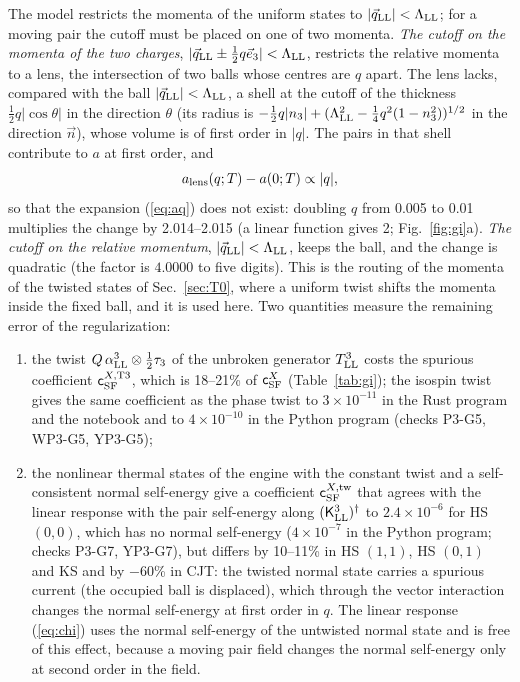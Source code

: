 \documentclass[aps,prd,onecolumn,superscriptaddress,nofootinbib,floatfix,longbibliography]{revtex4-2}
\newcommand{\LL}{{\rm LL}}
\newcommand{\SF}{{\rm SF}}
\begin{document}
The model restricts the momenta of the uniform states to $|\vec q_\LL|<\Lambda_\LL$; for a moving pair the cutoff must be placed on one
of two momenta. \emph{The cutoff on the momenta of the two charges}, $|\vec q_\LL\pm\frac12q\vec e_3|<\Lambda_\LL$, restricts the relative
momenta to a lens, the intersection of two balls whose centres are $q$ apart. The lens lacks, compared with the ball
$|\vec q_\LL|<\Lambda_\LL$, a shell at the cutoff of the thickness $\frac12q|\cos\theta|$ in the direction $\theta$ (its radius is
$-\frac12q|n_3|+(\Lambda_\LL^2-\frac14q^2(1-n_3^2))^{1/2}$ in the direction $\vec n$), whose volume is of first order in $|q|$. The pairs in that shell
contribute to $a$ at first order, and
\begin{equation}
a_{\rm lens}(q;T)-a(0;T)\propto|q|,
\label{eq:lens}
\end{equation}
so that the expansion (\ref{eq:aq}) does not exist: doubling $q$ from 0.005 to 0.01 multiplies the change by 2.014\mbox{--}2.015 (a
linear function gives 2; Fig.~\ref{fig:gi}a). \emph{The cutoff on the relative momentum}, $|\vec q_\LL|<\Lambda_\LL$, keeps the ball, and
the change is quadratic (the factor is $4.0000$ to five digits). This is the routing of the momenta of the twisted states of
Sec.~\ref{sec:T0}, where a uniform twist shifts the momenta inside the fixed ball, and it is used here. Two quantities measure the
remaining error of the regularization:
\begin{enumerate}
\item the twist $Q\,\alpha^3_\LL\otimes\frac12\tau_3$ of the unbroken generator $T^3_\LL$ costs the spurious coefficient $\mathsf c^{X,{\rm T3}}_\SF$, which
is 18\mbox{--}21\% of $\mathsf c^X_\SF$ (Table~\ref{tab:gi}); the isospin twist gives the same coefficient as the phase twist to $3\times10^{-11}$ in the Rust program and the notebook and to
$4\times10^{-10}$ in the Python program (checks P3-G5, WP3-G5, YP3-G5);
\item the nonlinear thermal states of the engine with the constant twist and a self-consistent normal self-energy give a
coefficient $\mathsf c^{X,{\rm tw}}_\SF$ that agrees with the linear response with the pair self-energy along $(\mathsf K^3_\LL)^\dagger$ to
$2.4\times10^{-6}$ for HS $(0,0)$, which has no normal self-energy ($4\times10^{-7}$ in the Python program; checks P3-G7, YP3-G7), but differs by 10\mbox{--}11\% in HS $(1,1)$, HS $(0,1)$ and KS and by
$-$60\% in CJT: the twisted normal state carries a spurious current (the occupied ball is displaced), which through the vector
interaction changes the normal self-energy at first order in $q$. The linear response (\ref{eq:chi}) uses the normal self-energy of
the untwisted normal state and is free of this effect, because a moving pair field changes the normal self-energy only at second
order in the field.
\end{enumerate}
\end{document}
